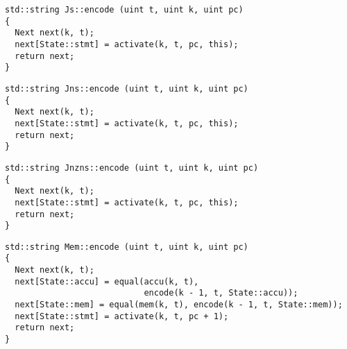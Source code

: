 \begin{lstlisting}[style=c++, style=encode]
std::string Js::encode (uint t, uint k, uint pc)
{
  Next next(k, t);
  next[State::stmt] = activate(k, t, pc, this);
  return next;
}
\end{lstlisting}


\begin{lstlisting}[style=c++, style=encode]
std::string Jns::encode (uint t, uint k, uint pc)
{
  Next next(k, t);
  next[State::stmt] = activate(k, t, pc, this);
  return next;
}
\end{lstlisting}


\begin{lstlisting}[style=c++, style=encode]
std::string Jnzns::encode (uint t, uint k, uint pc)
{
  Next next(k, t);
  next[State::stmt] = activate(k, t, pc, this);
  return next;
}
\end{lstlisting}


\newpage

\begin{lstlisting}[style=c++, style=encode]
std::string Mem::encode (uint t, uint k, uint pc)
{
  Next next(k, t);
  next[State::accu] = equal(accu(k, t),
                            encode(k - 1, t, State::accu));
  next[State::mem] = equal(mem(k, t), encode(k - 1, t, State::mem));
  next[State::stmt] = activate(k, t, pc + 1);
  return next;
}
\end{lstlisting}


